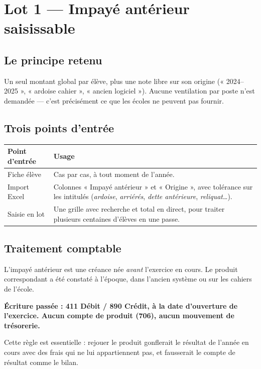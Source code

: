 \documentclass[11pt,a4paper]{report}
\newcommand{\encadre}[2]{%
  \begingroup
  \setlength{\fboxsep}{9pt}%
  \noindent\colorbox{sagibg}{%
    \begin{minipage}{\dimexpr\linewidth-2\fboxsep\relax}
    \textbf{\color{#1}#2}
    \end{minipage}}%
  \par\vspace{8pt}
  \endgroup}
\newcommand{\pointcle}[1]{\encadre{sagiteal}{#1}}
\begin{document}
\chapter{Lot 1 --- Impayé antérieur saisissable}

\section{Le principe retenu}

Un seul montant global par élève, plus une note libre sur son origine
(« 2024--2025 », « ardoise cahier », « ancien logiciel »). Aucune ventilation
par poste n'est demandée --- c'est précisément ce que les écoles ne peuvent
pas fournir.

\section{Trois points d'entrée}

\begin{center}
\begin{tabularx}{\linewidth}{@{}p{4.2cm}X@{}}
\toprule
\textbf{Point d'entrée} & \textbf{Usage} \\
\midrule
Fiche élève & Cas par cas, à tout moment de l'année. \\
Import Excel & Colonnes « Impayé antérieur » et « Origine », avec
  tolérance sur les intitulés (\textit{ardoise}, \textit{arriérés},
  \textit{dette antérieure}, \textit{reliquat}\ldots). \\
Saisie en lot & Une grille avec recherche et total en direct, pour traiter
  plusieurs centaines d'élèves en une passe. \\
\bottomrule
\end{tabularx}
\end{center}

\section{Traitement comptable}

L'impayé antérieur est une créance née \emph{avant} l'exercice en cours. Le
produit correspondant a été constaté à l'époque, dans l'ancien système ou sur
les cahiers de l'école.

\pointcle{Écriture passée : 411 Débit / 890 Crédit, à la date d'ouverture de
l'exercice. Aucun compte de produit (706), aucun mouvement de trésorerie.}

Cette règle est essentielle : rejouer le produit gonflerait le résultat de
l'année en cours avec des frais qui ne lui appartiennent pas, et fausserait le
compte de résultat comme le bilan.
\end{document}
